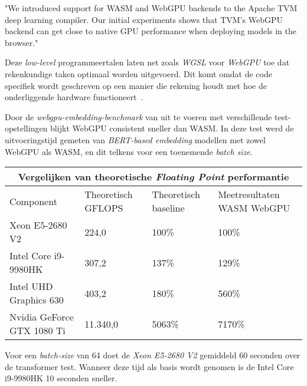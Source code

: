 \begin{displayquote}
    "We introduced support for WASM and WebGPU backends to the Apache TVM deep learning compiler. Our initial experiments shows that TVM's WebGPU backend can get close to native GPU performance when deploying models in the browser."
\end{displayquote}

Deze \textit{low-level} programmeertalen laten net zoals \textit{WGSL} voor \textit{WebGPU} toe dat rekenkundige taken optimaal worden uitgevoerd. Dit komt omdat de code specifiek wordt geschreven op een manier die rekening houdt met hoe de onderliggende hardware functioneert~\autocite{Knight2020}.

\bigbreak{}


\label{sec:transformerbench}

Door de \textit{webgpu-embedding-benchmark} van \textcite{Lochner2024} uit te voeren met verschillende test-opstellingen blijkt WebGPU consistent sneller dan WASM. In deze test werd de uitvoeringstijd gemeten van \textit{BERT-based embedding} modellen met zowel WebGPU als WASM, en dit telkens voor een toenemende \textit{batch size}.

\break{}

\begin{tabular}{ |p{5cm}|p{3cm}|p{3cm}|p{3cm}|  }
    \hline
    \multicolumn{4}{|c|}{Vergelijken van theoretische \textit{Floating Point} performantie} \\
    \hline
    Component& Theoretisch GFLOPS & Theoretisch baseline & Meetresultaten WASM WebGPU\\
    \hline
        Xeon E5-2680 V2             & 224,0     & 100\%  & 100\%       \\
        Intel Core i9-9980HK        & 307,2     & 137\%  & 129\%    \\
        Intel UHD Graphics 630      & 403,2     & 180\%  & 560\%    \\
        Nvidia GeForce GTX 1080 Ti  & 11.340,0  & 5063\% & 7170\%   \\
    \hline
\end{tabular}

\bigbreak{}

Voor een \textit{batch-size} van 64 doet de \textit{Xeon E5-2680 V2} gemiddeld 60 seconden over de transformer test. Wanneer deze tijd als basis wordt genomen is de Intel Core i9-9980HK 10 seconden sneller.

\bigbreak{}

